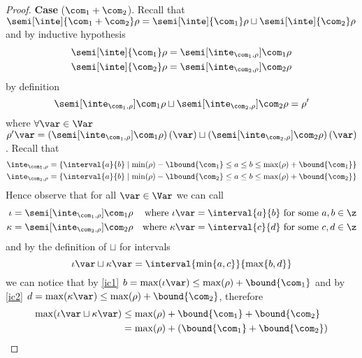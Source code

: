 \begin{proof}
  \noindent
  \textbf{Case} (\(\com_1 + \com_2\)).
  Recall that
  \({\semi[\inte]{\com_1 + \com_2}\rho} = {\semi[\inte]{\com_1}\rho}
  \sqcup {\semi[\inte]{\com_2}\rho}\) and by inductive hypothesis
  \begin{align*}
    \semi[\inte]{\com_1}\rho & = \semi[\inte_{\com_1, \rho}]{\com_1}\rho \\
    \semi[\inte]{\com_2}\rho & = \semi[\inte_{\com_2, \rho}]{\com_2}\rho
  \end{align*}
  by definition
  \begin{equation*}
    \semi[\inte_{\com_1, \rho}]{\com_1}\rho \sqcup \semi[\inte_{\com_2, \rho}]{\com_2}\rho = \rho'
  \end{equation*}
  where \(\forall \var \in \Var\)
  \(\rho'\var = {\left(\semi[\inte_{\com_1,
        \rho}]{\com_1}\rho\right)(\var)} \sqcup
  {\left(\semi[\inte_{\com_2, \rho}]{\com_2}\rho\right)
    (\var)}\).  Recall that
  \begin{align}
    \inte_{\com_1, \rho} & = \{\interval{a}{b} \mid \min(\rho) - \lbound{\com_1} \leq a \leq b \leq \max(\rho) + \bound{\com_1}\} \label{ic1}\\
    \inte_{\com_2, \rho} & = \{\interval{a}{b} \mid \min(\rho) - \lbound{\com_2} \leq a \leq b \leq \max(\rho) + \bound{\com_2}\} \label{ic2}
  \end{align}
  Hence observe that for all \(\var\in\Var\) we can call
  \begin{align*}
    \iota & = \semi[\inte_{\com_1, \rho}]{\com_1}\rho & \text{where } \iota\var = \interval{a}{b} \text{ for some } a,b\in\z \\
    \kappa & = \semi[\inte_{\com_2, \rho}]{\com_2}\rho & \text{where }\kappa\var = \interval{c}{d} \text{ for some } c,d \in\z
  \end{align*}
  and by the definition of \(\sqcup\) for intervals
  \begin{equation*}
    \iota\var \sqcup \kappa\var = \interval{\min\{a,c\}}{\max\{b,d\}}
  \end{equation*}
  we can notice that by \eqref{ic1}
  \(b = {\max(\iota\var)} \leq {\max(\rho) + \bound{\com_1}}\) and by
  \eqref{ic2}
  \(d = {\max(\kappa\var)} \leq {\max(\rho) + \bound{\com_2}}\),
    therefore
  \begin{align*}
    \max(\iota\var\sqcup\kappa\var) & \leq \max(\rho) + \bound{\com_1} + \bound{\com_2} \\
                                    & = \max(\rho) + (\bound{\com_1} + \bound{\com_2}) \\

\end{align*}
\end{proof}
